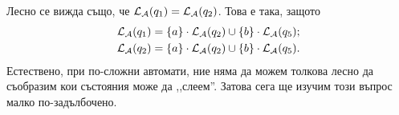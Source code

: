 \begin{example}
  Лесно се вижда също, че $\mathcal{L}_{\mathcal{A}}(q_1) = \mathcal{L}_{\mathcal{A}}(q_2)$.
  Това е така, защото
  \begin{align*}
    \mathcal{L}_{\mathcal{A}}(q_1) & = \{a\} \cdot \mathcal{L}_{\mathcal{A}}(q_2) \cup \{b\}\cdot\mathcal{L}_{\mathcal{A}}(q_5); \\
    \mathcal{L}_{\mathcal{A}}(q_2) & = \{a\} \cdot \mathcal{L}_{\mathcal{A}}(q_2) \cup \{b\}\cdot\mathcal{L}_{\mathcal{A}}(q_5).
  \end{align*}
  Естествено, при по-сложни автомати, ние няма да можем толкова лесно да съобразим кои състояния може да ,,слеем''. Затова сега ще изучим този въпрос малко по-задълбочено.
\end{example}




